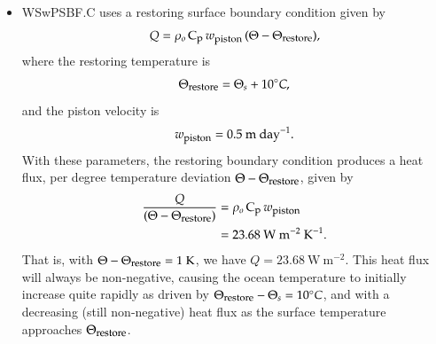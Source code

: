 \begin{itemize}
\begin{itemize}
\item {\sc WSwPSBF.C} uses a restoring surface boundary condition
  given by
\begin{equation}
 Q =  \rho_o \, \mbox{C}_{\mbox{\footnotesize p}} \, w_{\mbox{\footnotesize piston}} \, (\Theta - \Theta_{\mbox{\footnotesize restore}} ),
\label{eq:heat-flux-restoring}
\end{equation}
 where the restoring temperature is 
\begin{equation}
\Theta_{\mbox{\footnotesize restore}}  = \Theta_s + 10^{\circ}C,
\label{eq:restoring-temp}
\end{equation}
 and the piston velocity is 
\begin{equation}
  w_{\mbox{\footnotesize piston}} = 0.5~\mbox{m}~\mbox{day}^{-1}. 
\end{equation}
With these parameters, the restoring boundary condition produces a
heat flux, per degree temperature deviation $\Theta -
\Theta_{\mbox{\footnotesize restore}}$, given by
\begin{subequations}
\begin{align}
 \frac{Q}{(\Theta - \Theta_{\mbox{\footnotesize restore}} )} &= \rho_o \, \mbox{C}_{\mbox{\footnotesize p}} \, w_{\mbox{\footnotesize piston}}
 \\
 &= 23.68~\mbox{W}~\mbox{m}^{-2}~\mbox{K}^{-1}.  
\end{align}
\end{subequations}
That is, with $\Theta - \Theta_{\mbox{\footnotesize restore}} =
1~\mbox{K}$, we have $Q = 23.68~\mbox{W}~\mbox{m}^{-2}$.  This heat
flux will always be non-negative, causing the ocean temperature to
initially increase quite rapidly as driven by
$\Theta_{\mbox{\footnotesize restore}} - \Theta_s = 10^{\circ}C$, and
with a decreasing (still non-negative) heat flux as the surface
temperature approaches $\Theta_{\mbox{\footnotesize restore}}$.

\end{itemize} 

\end{itemize}


